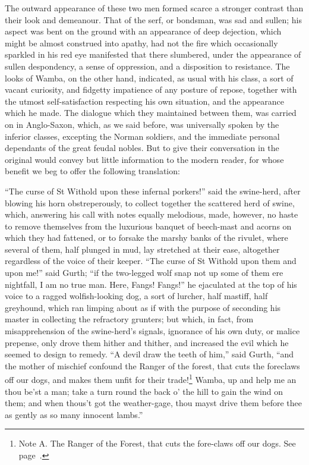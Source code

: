 The outward appearance of these two men formed scarce a stronger
contrast than their look and demeanour. That of the serf, or bondsman,
was sad and sullen; his aspect was bent on the ground with an appearance
of deep dejection, which might be almost construed into apathy, had not
the fire which occasionally sparkled in his red eye manifested that
there slumbered, under the appearance of sullen despondency, a sense of
oppression, and a disposition to resistance. The looks of Wamba, on the
other hand, indicated, as usual with his class, a sort of vacant
curiosity, and fidgetty impatience of any posture of repose, together
with the utmost self-satisfaction respecting his own situation, and the
appearance which he made. The dialogue which they maintained between
them, was carried on in Anglo-Saxon, which, as we said before, was
universally spoken by the inferior classes, excepting the Norman
soldiers, and the immediate personal dependants of the great feudal
nobles. But to give their conversation in the original would convey but
little information to the modern reader, for whose benefit we beg to
offer the following translation:

``The curse of St Withold upon these infernal porkers!'' said the
swine-herd, after blowing his horn obstreperously, to collect together
the scattered herd of swine, which, answering his call with notes
equally melodious, made, however, no haste to remove themselves from the
luxurious banquet of beech-mast and acorns on which they had fattened,
or to forsake the marshy banks of the rivulet, where several of them,
half plunged in mud, lay stretched at their ease, altogether regardless
of the voice of their keeper. ``The curse of St Withold upon them and
upon me!'' said Gurth; ``if the two-legged wolf snap not up some of them
ere nightfall, I am no true man. Here, Fangs! Fangs!'' he ejaculated at
the top of his voice to a ragged wolfish-looking dog, a sort of lurcher,
half mastiff, half greyhound, which ran limping about as if with the
purpose of seconding his master in collecting the refractory grunters;
but which, in fact, from misapprehension of the swine-herd's signals,
ignorance of his own duty, or malice prepense, only drove them hither
and thither, and increased the evil which he seemed to design to remedy.
``A devil draw the teeth of him,'' said Gurth, ``and the mother of
mischief confound the Ranger of the forest, that cuts the foreclaws off
our dogs, and makes them unfit for their trade!\footnote{Note A. The Ranger
of the Forest, that cuts the
fore-claws off our dogs. See page~\pageref{noteCI}.} Wamba, up and
help me an thou be'st a man; take a turn round the back o' the hill to
gain the wind on them; and when thous't got the weather-gage, thou mayst
drive them before thee as gently as so many innocent lambs.''

